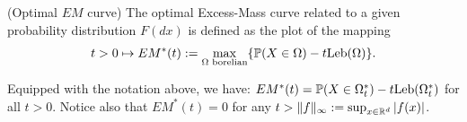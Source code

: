 %
\begin{definition}\label{aistat:def:opt}{\sc (Optimal $EM$ curve)} The optimal Excess-Mass curve related to a given probability distribution $F(dx)$ is defined as the plot of the mapping $$t>0\mapsto EM^*(t):=\max_{\Omega\text{ borelian} } \{ {\mathbb{P}} (X\in \Omega)-t\text{Leb}(\Omega) \}.$$ 
\end{definition}
Equipped with the notation above, we have: $EM^*(t)=\mathbb{P}(X \in \Omega_t^*)-t \text{Leb}(\Omega_t^*)$ for all $t>0$.
Notice also that $EM^*(t) = 0$ for any $t>\|f\|_\infty:=\sup_{x\in \mathbb{R}^d}\vert f(x)\vert$. 

